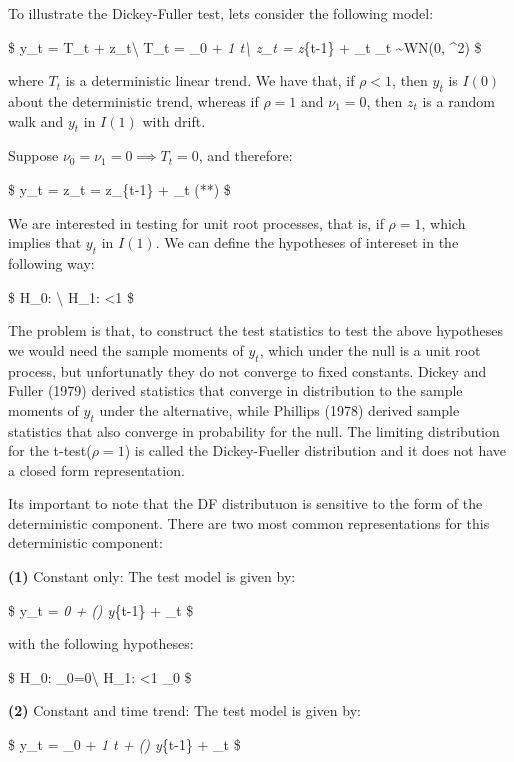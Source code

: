 \documentclass[]{article}
\begin{document}
To illustrate the Dickey-Fuller test, lets consider the following model:

\$ y\_t = T\_t + z\_t\textbackslash{} T\_t = \nu\_0 + \nu\emph{1
t\textbackslash{} z\_t = \rho z}\{t-1\} + \epsilon\_t \quad \epsilon\_t
\sim WN(0, \sigma\^{}2) \$

where \(T_t\) is a deterministic linear trend. We have that, if
\(\rho < 1\), then \(y_t\) is \(I(0)\) about the deterministic trend,
whereas if \(\rho=1\) and \(\nu_1=0\), then \(z_t\) is a random walk and
\(y_t\) in \(I(1)\) with drift.

Suppose \(\nu_0=\nu_1=0 \implies T_t=0\), and therefore:

\$ y\_t = z\_t = \rho z\_\{t-1\} + \epsilon\_t \quad (**) \$

We are interested in testing for unit root processes, that is, if
\(\rho=1\), which implies that \(y_t\) in \(I(1)\). We can define the
hypotheses of intereset in the following way:

\$ H\_0: \textbackslash{} H\_1: \textbar{}\rho\textbar\textless1
\$

The problem is that, to construct the test statistics to test the above
hypotheses we would need the sample moments of \(y_t\), which under the
null is a unit root process, but unfortunatly they do not converge to
fixed constants. Dickey and Fuller (1979) derived statistics that
converge in distribution to the sample moments of \(y_t\) under the
alternative, while Phillips (1978) derived sample statistics that also
converge in probability for the null. The limiting distribution for the
t-test(\(\rho=1\)) is called the Dickey-Fueller distribution and it does
not have a closed form representation.

Its important to note that the DF distributuon is sensitive to the form
of the deterministic component. There are two most common
representations for this deterministic component:

\textbf{(1)} Constant only: The test model is given by:

\$ \Delta y\_t = \nu\emph{0 + () y}\{t-1\} + \epsilon\_t \$

with the following hypotheses:

\$ H\_0:  \quad \nu\_0=0\textbackslash{} H\_1:
\textbar{}\rho\textbar\textless1 \quad \nu\_0  \$

\textbf{(2)} Constant and time trend: The test model is given by:

\$ \Delta y\_t = \nu\_0 + \nu\emph{1 t + () y}\{t-1\} +
\epsilon\_t \$
\end{document}
